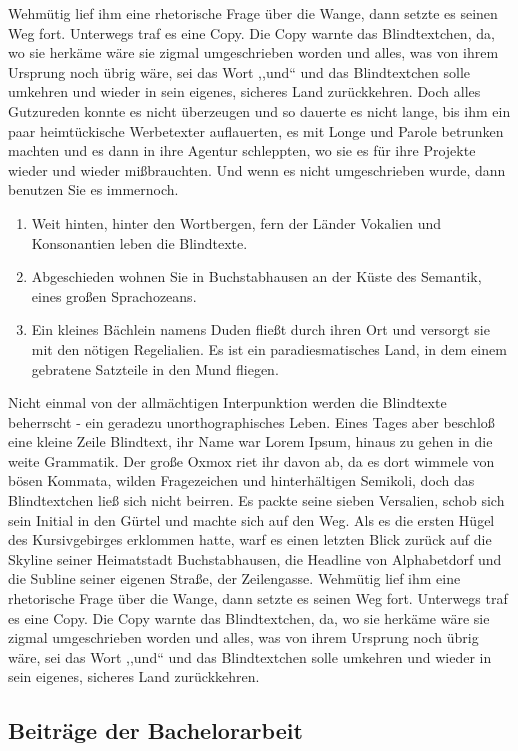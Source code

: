 \documentclass[12pt,a4paper,twoside]{scrartcl}
\numberwithin{equation}{section}
\begin{document}
Wehmütig lief ihm eine rhetorische Frage über die Wange, dann setzte es seinen Weg fort. Unterwegs traf es eine Copy. Die Copy warnte das Blindtextchen, da, wo sie herkäme wäre sie zigmal umgeschrieben worden und alles, was von ihrem Ursprung noch übrig wäre, sei das Wort ,,und`` und das Blindtextchen solle umkehren und wieder in sein eigenes, sicheres Land zurückkehren. Doch alles Gutzureden konnte es nicht überzeugen und so dauerte es nicht lange, bis ihm ein paar heimtückische Werbetexter auflauerten, es mit Longe und Parole betrunken machten und es dann in ihre Agentur schleppten, wo sie es für ihre Projekte wieder und wieder mißbrauchten. Und wenn es nicht umgeschrieben wurde, dann benutzen Sie es immernoch.
\begin{enumerate}
\item Weit hinten, hinter den Wortbergen, fern der Länder Vokalien und Konsonantien leben die Blindtexte.
\item Abgeschieden wohnen Sie in Buchstabhausen an der Küste des Semantik, eines großen Sprachozeans.
\item
Ein kleines Bächlein namens Duden fließt durch ihren Ort und versorgt sie mit den nötigen Regelialien. Es ist ein paradiesmatisches Land, in dem einem gebratene Satzteile in den Mund fliegen.
\end{enumerate}
Nicht einmal von der allmächtigen Interpunktion werden die Blindtexte beherrscht - ein geradezu unorthographisches Leben. Eines Tages aber beschloß eine kleine Zeile Blindtext, ihr Name war Lorem Ipsum, hinaus zu gehen in die weite Grammatik. Der große Oxmox riet ihr davon ab, da es dort wimmele von bösen Kommata, wilden Fragezeichen und hinterhältigen Semikoli, doch das Blindtextchen ließ sich nicht beirren. Es packte seine sieben Versalien, schob sich sein Initial in den Gürtel und machte sich auf den Weg. Als es die ersten Hügel des Kursivgebirges erklommen hatte, warf es einen letzten Blick zurück auf die Skyline seiner Heimatstadt Buchstabhausen, die Headline von Alphabetdorf und die Subline seiner eigenen Straße, der Zeilengasse. Wehmütig lief ihm eine rhetorische Frage über die Wange, dann setzte es seinen Weg fort. Unterwegs traf es eine Copy. Die Copy warnte das Blindtextchen, da, wo sie herkäme wäre sie zigmal umgeschrieben worden und alles, was von ihrem Ursprung noch übrig wäre, sei das Wort ,,und`` und das Blindtextchen solle umkehren und wieder in sein eigenes, sicheres Land zurückkehren.

\subsection{Beiträge der Bachelorarbeit}
\end{document}
